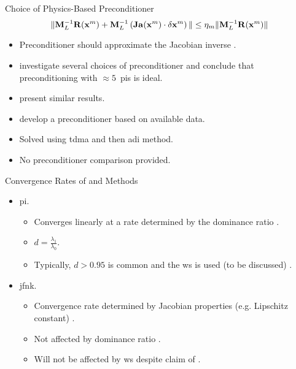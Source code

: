 \begin{frame}{Choice of Physics-Based Preconditioner}
  \begin{equation}
    \label{eq:left_precondition}
    \| \mathbf{M}_L^{-1} \mathbf{R}(\mathbf{x}^m) + \mathbf{M}_L^{-1} \left( \mathbf{Ja}(\mathbf{x}^m)
      \cdot \delta\mathbf{x}^m \right) \| \le \eta_m \| \mathbf{M}_L^{-1} \mathbf{R}(\mathbf{x}^m) \|
  \end{equation}
  \begin{itemize}
    \item Preconditioner should approximate the Jacobian inverse
      \cite{textbookkelley}.
    \item \citeauthor{gill_azmy} investigate several choices of preconditioner
      and conclude that preconditioning with $\approx 5$~\glspl{pi} is ideal.
    \item \citeauthor{jfnk_wielandt} present similar results.
    \item \citeauthor{qe2paper} develop a preconditioner based on available
      data.
    \item Solved using \gls{tdma} and then \gls{adi} method.
    \item No preconditioner comparison provided.
  \end{itemize}
\end{frame}

\begin{frame}{Convergence Rates of  and 
  Methods}
  \begin{itemize}
    \item \gls{pi}.
    \begin{itemize}
      \item Converges linearly at a rate determined by the dominance ratio
        \cite{nakamura}.
      \item $d = \frac{\lambda_1}{\lambda_0}$.
      \item Typically, $d > 0.95$ is common and the \gls{ws} is used (to be 
        discussed) \cite{gehinThesis}.
    \end{itemize}
    \item \gls{jfnk}.
    \begin{itemize}
      \item Convergence rate determined by Jacobian properties (e.g. Lipschitz
        constant) \cite{textbookkelley}.
      \item Not affected by dominance ratio \cite{gill_azmy}.
      \item Will not be affected by \gls{ws} despite claim of
        \citeauthor{qe2paper}.
    \end{itemize}
  \end{itemize}
\end{frame}
